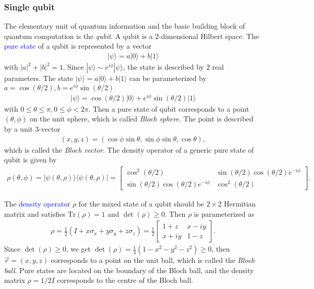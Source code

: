 \documentclass{article}
\newcommand{\ket}[1]{| #1 \rangle}  %
\newcommand{\bra}[1]{\langle #1|} %
\begin{document}
\subsubsection{Single qubit}
The elementary unit of quantum information and the basic building block of quantum computation is the \textit{qubit}.
A qubit is a $2$-dimensional Hilbert space. The \textcolor{blue}{pure state} of a qubit is represented by a vector 
\begin{align}
	\ket{\psi}=a\ket{0}+b\ket{1}
\end{align} 
with $|a|^2+|b|^2=1$. 
Since $\ket{\psi}\sim e^{i \phi}\ket{\psi}$, the state is described by $2$ real parameters. The state $\ket{\psi}=a\ket{0}+b\ket{1}$ can be parameterized by $a=\cos(\theta/2), b=e^{i\phi}\sin(\theta/2)$ 
\begin{align}
	\ket{\psi}= \cos(\theta/2)\ket{0} + e^{i\phi}\sin(\theta/2) \ket{1}
\end{align}
with $0\le \theta\le \pi, 0\le \phi < 2\pi$.
Then a pure state of qubit corresponds to a point $(\theta,\phi)$ on the unit sphere, which is called \textit{Bloch sphere}. The point is described by a unit $3$-vector 
\begin{align}
	(x, y, z)=(\cos\phi \sin\theta, \sin\phi \sin\theta, \cos\theta),
\end{align}
which is called the \textit{Bloch vector}.
The density operator of a generic pure state of qubit is given by 
\begin{align}
	\rho(\theta, \phi)=\ket{\psi(\theta, \rho)}\bra{\psi(\theta, \rho)}
	=\left[ \begin{array}{cc} 
		\cos^2 (\theta/2) & \sin(\theta/2) \cos(\theta/2) e^{-i\phi}\\ 
		\sin(\theta/2) \cos(\theta/2) e^{-i\phi} & \cos^2 (\theta/2)
	\end{array} \right].
\end{align}

The \textcolor{blue}{density operator} $\rho$ for the mixed state of a qubit should be $2\times 2$ Hermitian matrix and satisfies $\text{Tr}(\rho)=1$ and $\det(\rho)\ge 0$. Then $\rho$ is parameterized as
\begin{align}
	\rho = \frac{1}{2}(I+x\sigma_x+y\sigma_y+z\sigma_z)
	= \frac{1}{2} \left[ \begin{array}{cc}
		1+z & x-iy \\
		x+iy & 1-z
	\end{array} \right].	
\end{align}
Since $\det(\rho)\ge 0$, we get $\det(\rho)=\frac{1}{4}(1-x^2-y^2-z^2)\ge 0$, then $\vec{r}=(x,y,z)$ corresponds to a point on the unit ball, which is called the \textit{Bloch ball}. Pure states are located on the boundary of the Bloch ball, and the density matrix $\rho = 1/2 I$ corresponds to the centre of the Bloch ball.
\end{document}
